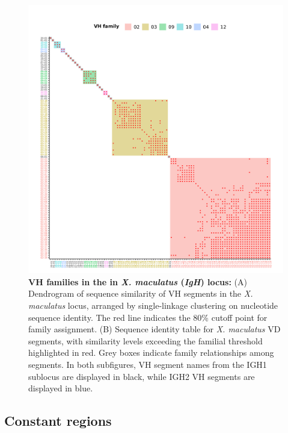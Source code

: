 				\begin{figure}
	\centering
	\includegraphics[width=\textwidth]{_Figures/png/xma-vh-families-map} %
	\caption[VH families in the in \textit{X. maculatus} \textit{IgH} locus]{\textbf{VH families in the in \textit{X. maculatus} (\textit{IgH}) locus:} (A) Dendrogram of sequence similarity of VH segments in the \textit{X. maculatus} locus, arranged by single-linkage clustering on nucleotide sequence identity. The red line indicates the 80\% cutoff point for family assignment. (B) Sequence identity table for \textit{X. maculatus} VD segments, with similarity levels exceeding the familial threshold highlighted in red. Grey boxes indicate family relationships among segments. In both subfigures, VH segment names from the IGH1 sublocus are displayed in black, while IGH2 VH segments are displayed in blue.}
	\label{fig:xma-vh-families-map}
	\end{figure}



	\subsection{Constant regions}
	
